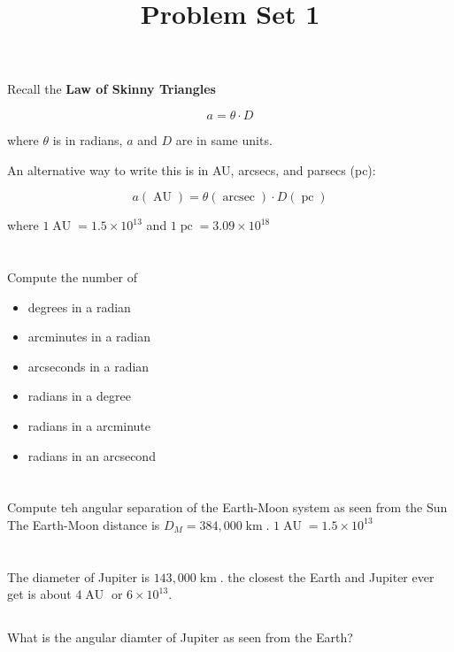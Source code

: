 \documentclass[11pt]{scrartcl}
\title{Problem Set 1}
\DeclareMathOperator{\AU}{AU}
\DeclareMathOperator{\arcsec}{arcsec}
\DeclareMathOperator{\pc}{pc}
\DeclareMathOperator{\km}{km}
\newcommand\pow[2]{\ensuremath{#1 \times 10^{#2}}}
\begin{document}
\maketitle

Recall the \textbf{Law of Skinny Triangles}

\[a = \theta \cdot D\]

where $\theta$ is in radians, $a$ and $D$ are in same units.

An alternative way to write this is in AU, arcsecs, and parsecs (pc):

\[a(\AU) = \theta (\arcsec) \cdot D (\pc)\]

where $1\AU = \pow{1.5}{13}$ and $1\pc = \pow{3.09}{18}$

\section{}

Compute the number of

\begin{itemize}
\item degrees in a radian
\item arcminutes in a radian
\item arcseconds in a radian
\item radians in a degree
\item radians in a arcminute
\item radians in an arcsecond
\end{itemize}


\section{}

Compute teh angular separation of the Earth-Moon system as seen from the Sun The Earth-Moon distance is $D_M = 384,000\km$. $1\AU = \pow{1.5}{13}$


\section{}

The diameter of Jupiter is $143,000\km$. the closest the Earth and Jupiter ever get is about $4\AU$ or $\pow{6}{13}$.

\subsection{}

What is the angular diamter of Jupiter as seen from the Earth?
\end{document}
